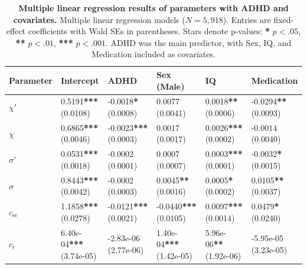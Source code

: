 \begin{table}[H]
\centering
\begin{tabularx}{\linewidth}{lXXXXX}
\toprule
\textbf{Parameter} & \textbf{Intercept} & \textbf{ADHD} & \textbf{Sex (Male)} & \textbf{IQ} & \textbf{Medication} \\
\midrule
$\chi'$ & 0.5191\textbf{***} (0.0108) & -0.0018\textbf{*} (0.0008) & 0.0077 (0.0041) & 0.0018\textbf{**} (0.0006) & -0.0294\textbf{**} (0.0093) \\
$\chi$ & 0.6865\textbf{***} (0.0046) & -0.0023\textbf{***} (0.0003) & 0.0017 (0.0017) & 0.0026\textbf{***} (0.0002) & -0.0014 (0.0040) \\
$\sigma'$ & 0.0531\textbf{***} (0.0018) & -0.0002 (0.0001) & 0.0007 (0.0007) & 0.0003\textbf{***} (0.0001) & -0.0032\textbf{*} (0.0015) \\
$\sigma$ & 0.8443\textbf{***} (0.0042) & -0.0002 (0.0003) & 0.0045\textbf{**} (0.0016) & 0.0005\textbf{*} (0.0002) & 0.0105\textbf{**} (0.0037) \\
$c_{\mathrm{se}}$ & 1.1858\textbf{***} (0.0278) & -0.0121\textbf{***} (0.0021) & -0.0440\textbf{***} (0.0105) & 0.0097\textbf{***} (0.0014) & 0.0479\textbf{*} (0.0240) \\
$c_t$ & 6.40e-04\textbf{***} (3.74e-05) & -2.83e-06 (2.77e-06) & 1.40e-04\textbf{***} (1.42e-05) & 5.96e-06\textbf{**} (1.92e-06) & -5.95e-05 (3.23e-05) \\
\bottomrule
\end{tabularx}
\vspace{1mm}
\raggedright
\small
\captionsetup{labelfont=bf}
\caption{\textbf{Multiple linear regression results of parameters with ADHD and covariates.} Multiple linear regression models ($N=5,918$). Entries are fixed-effect coefficients with Wald SEs in parentheses. Stars denote p-values: \textbf{*} $p<.05$, \textbf{**} $p<.01$, \textbf{***} $p<.001$. ADHD was the main predictor, with Sex, IQ, and Medication included as covariates.}
\label{tab:lm_pomdp}
\end{table}